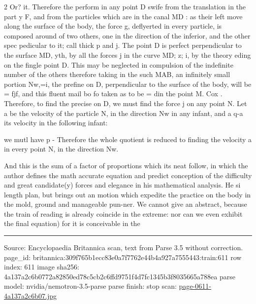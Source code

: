 \documentclass[10pt]{article}
\begin{document}
\begin{multicols}{2}
Or? it. Therefore the perform in any point D swife from the translation in the part y F, and from the particles which are in the canal MD : as their left move along the surface of the body, the force g, deflyerted in every particle, is composed around of two others, one in the direction of the inferior, and the other spec pedicular to it; call thick p and j. The point D is perfect perpendicular to the surface MD, yth, by all the forces j in the curve MD; z; i, by the theory eding on the fingle point D. This may be neglected in compulsion of the indefinite number of the others therefore taking in the such MAB, an infinitely small portion Nw,=i, the prefine on D, perpendicular to the surface of the body, will be = fjf, and this fluent mail bo fo taken as to be = din the point M. Cox . Therefore, to find the precise on D, we must find the force j on any point N. Let a be the velocity of the particle N, in the direction Nw in any infant, and a q-a its velocity in the following infant:

we mutl have p - Therefore the whole quotient is reduced to finding the velocity a in every point N, in the direction Nw.

And this is the sum of a factor of proportions which its neat follow, in which the author defines the math accurate equation and predict conception of the difficulty and great candidate(y) forces and elegance in his mathematical analysis. He si length plan, but brings out an motion which expedite the practice on the body in the mold, ground and manageable pun-ner. We cannot give an abstract, because the train of reading is already coincide in the extreme: nor can we even exhibit the final equation) for it is conceivable in the

\end{multicols}
\vfill\par\noindent\rule{\linewidth}{0.4pt}\par
{\scriptsize\color{gray}\noindent Source: Encyclopaedia Britannica scan, text from Parse 3.5 without correction. page\_id: britannica:309f765b1ecc83e0a7f7762e44b4a927a7555443:train:611 \quad row index: 611 \quad image sha256: 4a137a2c6b0772a82850ed78c5cb2c6ffd9751f4d7fc1345b3f8035665a788ea \quad parse model: nvidia/nemotron-3.5-parse \quad parse finish: stop \quad scan: \href{../scans/page-0611-4a137a2c6b07.jpg}{page-0611-4a137a2c6b07.jpg}\par}
\end{document}
